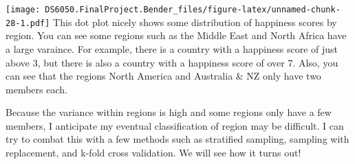 \documentclass[]{article}
\newenvironment{Shaded}{\begin{snugshade}}{\end{snugshade}}
\newcommand{\CommentTok}[1]{\textcolor[rgb]{0.56,0.35,0.01}{\textit{#1}}}
\newcommand{\DataTypeTok}[1]{\textcolor[rgb]{0.13,0.29,0.53}{#1}}
\newcommand{\FloatTok}[1]{\textcolor[rgb]{0.00,0.00,0.81}{#1}}
\newcommand{\KeywordTok}[1]{\textcolor[rgb]{0.13,0.29,0.53}{\textbf{#1}}}
\newcommand{\NormalTok}[1]{#1}
\newcommand{\OperatorTok}[1]{\textcolor[rgb]{0.81,0.36,0.00}{\textbf{#1}}}
\newcommand{\StringTok}[1]{\textcolor[rgb]{0.31,0.60,0.02}{#1}}
\begin{document}
\begin{Shaded}
\end{Shaded}

\texttt{[image: DS6050.FinalProject.Bender\_files/figure-latex/unnamed-chunk-28-1.pdf]}
This dot plot nicely shows some distribution of happiness scores by
region. You can see some regions such as the Middle East and North
Africa have a large varaince. For example, there is a country with a
happiness score of just above 3, but there is also a country with a
happiness score of over 7. Also, you can see that the regions North
America and Australia \& NZ only have two members each.

Because the variance within regions is high and some regions only have a
few members, I anticipate my eventual classification of region may be
difficult. I can try to combat this with a few methods such as
stratified sampling, sampling with replacement, and k-fold cross
validation. We will see how it turns out!
\end{document}
